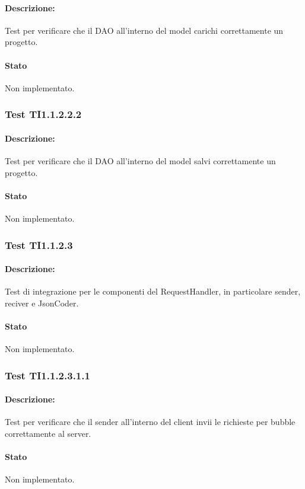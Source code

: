 \documentclass[../PianoDiQualifica.tex]{subfiles}
\begin{document}
	\paragraph{Descrizione:} Test per verificare che il DAO all'interno del model carichi correttamente un progetto.
	\paragraph{Stato} Non implementato.
	
	\subsubsection{Test TI1.1.2.2.2}
	\paragraph{Descrizione:} Test per verificare che il DAO all'interno del model salvi correttamente un progetto.
	\paragraph{Stato} Non implementato.
	\subsubsection{Test TI1.1.2.3}
	\paragraph{Descrizione:} Test di integrazione per le componenti del RequestHandler, in particolare sender, reciver e JsonCoder.
	\paragraph{Stato} Non implementato.
	\subsubsection{Test TI1.1.2.3.1.1}
	\paragraph{Descrizione:} Test per verificare che il sender all'interno del client invii le richieste per bubble correttamente al server.
	\paragraph{Stato} Non implementato.
	
\end{document}
